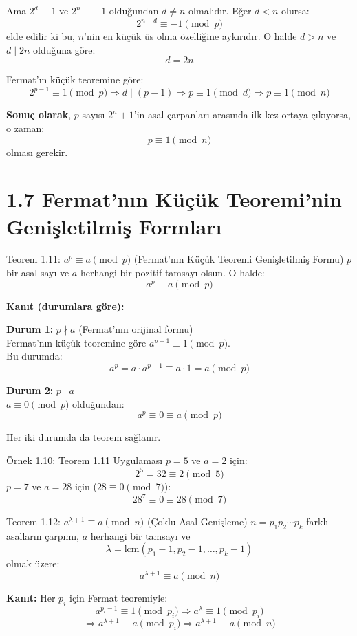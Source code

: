 Ama $2^d \equiv 1$ ve $2^n \equiv -1$ olduğundan $d \ne n$ olmalıdır. Eğer $d < n$ olursa:
\[
2^{n - d} \equiv -1 \pmod{p}
\]
elde edilir ki bu, $n$'nin en küçük üs olma özelliğine aykırıdır. O halde $d > n$ ve $d \mid 2n$ olduğuna göre:
\[
d = 2n
\]

Fermat'ın küçük teoremine göre:
\[
2^{p-1} \equiv 1 \pmod{p} \Rightarrow d \mid (p - 1)
\Rightarrow p \equiv 1 \pmod{d} \Rightarrow p \equiv 1 \pmod{n}
\]

\textbf{Sonuç olarak}, $p$ sayısı $2^n + 1$'in asal çarpanları arasında ilk kez ortaya çıkıyorsa, o zaman:
\[
\boxed{p \equiv 1 \pmod{n}}
\]
olması gerekir.

\section*{1.7 Fermat'nın Küçük Teoremi'nin Genişletilmiş Formları}

\begin{theorembox}{Teorem 1.11: $a^p \equiv a \pmod{p}$ (Fermat'nın Küçük Teoremi Genişletilmiş Formu)}
$p$ bir asal sayı ve $a$ herhangi bir pozitif tamsayı olsun. O halde:
\[
a^p \equiv a \pmod{p}
\]

\textbf{Kanıt (durumlara göre):}

\textbf{Durum 1:} $p \nmid a$ (Fermat'nın orijinal formu)\\
Fermat'nın küçük teoremine göre $a^{p-1} \equiv 1 \pmod{p}$.\\
Bu durumda:
\[
a^p = a \cdot a^{p-1} \equiv a \cdot 1 = a \pmod{p}
\]

\textbf{Durum 2:} $p \mid a$\\
$a \equiv 0 \pmod{p}$ olduğundan:
\[
a^p \equiv 0 \equiv a \pmod{p}
\]

Her iki durumda da teorem sağlanır.
\end{theorembox}

\begin{examplebox}{Örnek 1.10: Teorem 1.11 Uygulaması}
$p = 5$ ve $a = 2$ için:
\[
2^5 = 32 \equiv 2 \pmod{5}
\]
$p = 7$ ve $a = 28$ için ($28 \equiv 0 \pmod{7}$):
\[
28^7 \equiv 0 \equiv 28 \pmod{7}
\]
\end{examplebox}

\begin{theorembox}{Teorem 1.12: $a^{\lambda + 1} \equiv a \pmod{n}$ (Çoklu Asal Genişleme)}
$n = p_1p_2 \cdots p_k$ farklı asalların çarpımı, $a$ herhangi bir tamsayı ve
\[
\lambda = \text{lcm}(p_1 - 1, p_2 - 1, \ldots, p_k - 1)
\]
olmak üzere:
\[
a^{\lambda + 1} \equiv a \pmod{n}
\]

\textbf{Kanıt:} Her $p_i$ için Fermat teoremiyle:
\[
a^{p_i - 1} \equiv 1 \pmod{p_i} \Rightarrow a^\lambda \equiv 1 \pmod{p_i}
\]
\[
\Rightarrow a^{\lambda + 1} \equiv a \pmod{p_i} \Rightarrow a^{\lambda + 1} \equiv a \pmod{n}
\]
\end{theorembox}

